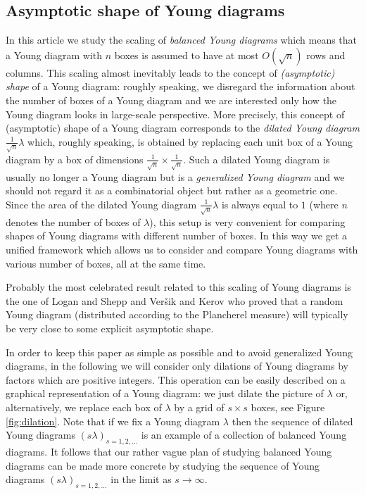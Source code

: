 \documentclass[12pt]{amsart}
\theoremstyle{plain}
\theoremstyle{remark}
\begin{document}
\subsection{Asymptotic shape of Young diagrams}
In this article we study the scaling of \emph{balanced Young diagrams} which
means that a Young diagram with $n$ boxes is assumed to have at most
$O(\sqrt{n})$ rows and columns. This scaling almost inevitably leads to the
concept of \emph{(asymptotic) shape} of a Young diagram: roughly speaking, we
disregard the information about the number of boxes of a Young diagram and we
are interested only how the Young diagram looks in large-scale perspective. More
precisely, this concept of (asymptotic) shape of a Young diagram corresponds to
the \emph{dilated Young diagram} $\frac{1}{\sqrt{n}} \lambda$ which, roughly
speaking, is obtained by replacing each unit box of a Young diagram by a box of
dimensions $\frac{1}{\sqrt{n}} \times \frac{1}{\sqrt{n}}$. Such a dilated Young
diagram is usually no longer a Young diagram but is a \emph{generalized Young
diagram} and we should not regard it as a combinatorial object but rather as a
geometric one. Since the area of the dilated Young diagram $\frac{1}{\sqrt{n}}
\lambda$ is always equal to $1$ (where $n$ denotes the number of boxes of
$\lambda$), this setup is very convenient for comparing shapes of Young diagrams
with different number of boxes. In this way we get a unified framework which
allows us to consider and compare Young diagrams with various number of boxes,
all at the same time. 

Probably the most celebrated result related to this scaling of Young diagrams is
the one of Logan and Shepp \cite{LoganShepp1977} and Ver{\v{s}}ik and Kerov
\cite{VervsikKerov1977} who proved that a random Young diagram (distributed
according to the Plancherel measure) will typically be very close to some
explicit asymptotic shape.

In order to keep this paper as simple as possible and to avoid generalized
Young diagrams, in the following we will consider only dilations of Young
diagrams by factors which are positive integers. This operation can be
easily described on a graphical representation of a Young diagram: we just
dilate the picture of $\lambda$ or, alternatively, we replace each box of
$\lambda$ by a grid of $s\times s$ boxes, see Figure \ref{fig:dilation}.
Note that if we fix a Young diagram $\lambda$ then the sequence of dilated Young
diagrams $(s\lambda)_{s=1,2,\dots}$ is an example of a collection of balanced
Young diagrams. It follows that our rather vague plan of studying balanced
Young diagrams can be made more concrete by studying the sequence of Young
diagrams $(s\lambda)_{s=1,2,\dots}$ in the limit as $s\to\infty$.
\end{document}
